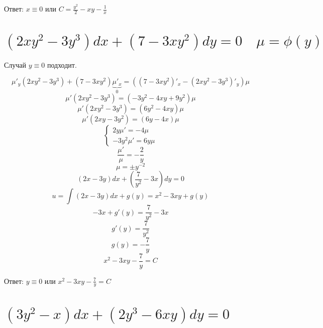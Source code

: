 Ответ: $x\equiv0$ или $C = \frac{y^2}{2} - xy - \frac{1}{x}$

\section{$(2xy^2-3y^3)dx+(7-3xy^2)dy=0 \quad \mu=\phi(y)$}

Случай $y\equiv0$ подходит.

\[\mu'_y (2xy^2-3y^3) + (7-3xy^2) \underbrace{\mu'_x}_{0} = ((7-3xy^2)'_x - (2xy^2-3y^3)'_y)\mu\]
\[\mu' (2xy^2-3y^3) = (-3y^2 - 4xy + 9y^2)\mu\]
\[\mu' (2xy^2-3y^3) = (6y^2 - 4xy)\mu\]
\[\mu' (2xy-3y^2) = (6y - 4x)\mu\]
\[\begin{cases}
        2y\mu' = -4\mu \\
        -3y^2\mu' = 6y\mu
    \end{cases}\]
\[\frac{\mu'}{\mu} = -\frac{2}{y}\]
\[\mu = \pm y^{-2}\]
\[(2x-3y)dx+(\frac{7}{y^2}-3x)dy = 0\]
\[u = \int (2x-3y)dx + g(y) = x^2 -3xy + g(y)\]
\[-3x + g'(y) = \frac{7}{y^2}-3x\]
\[g'(y) = \frac{7}{y^2}\]
\[g(y) = -\frac{7}{y}\]
\[x^2 -3xy - \frac{7}{y} = C\]

Ответ: $y \equiv 0$ или $x^2 -3xy - \frac{7}{y} = C$

\section{$(3y^2-x)dx+(2y^3-6xy)dy=0$}


